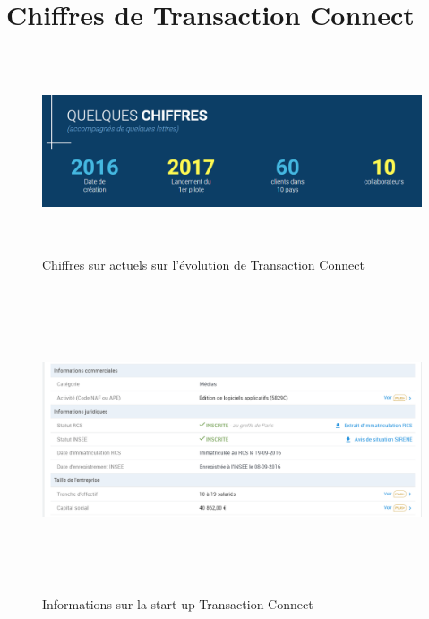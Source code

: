 \section{Chiffres de Transaction Connect}
\begin{figure}[h]
\begin{center}
\includegraphics[width=15cm,height=6cm]{images/chiffres_tc.png}
\caption[Chiffres sur actuels sur l'évolution de Transaction Connect]{Chiffres sur actuels sur l'évolution de Transaction Connect}
\label{monlabel}
\end{center}
\end{figure}

\begin{figure}[h]
\begin{center}
\includegraphics[width=15cm,height=9cm]{images/chiffre_affaire.png}
\caption[Informations sur la start-up Transaction Connect]{Informations sur la start-up Transaction Connect}
\label{monlabel}
\end{center}
\end{figure}
\newpage

